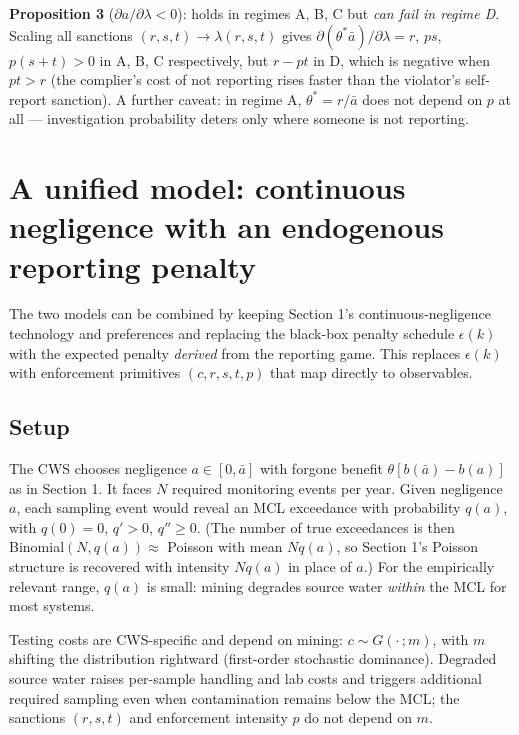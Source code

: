 \documentclass{article}
\begin{document}
\textbf{Proposition 3} ($\partial a/\partial\lambda < 0$): holds in regimes A, B, C but \emph{can fail in regime D}. Scaling all sanctions $(r,s,t) \to \lambda(r,s,t)$ gives $\partial(\theta^*\bar{a})/\partial\lambda = r$, $ps$, $p(s+t) > 0$ in A, B, C respectively, but $r - pt$ in D, which is negative when $pt > r$ (the complier's cost of not reporting rises faster than the violator's self-report sanction). A further caveat: in regime A, $\theta^* = r/\bar{a}$ does not depend on $p$ at all --- investigation probability deters only where someone is not reporting.

\section{A unified model: continuous negligence with an endogenous reporting penalty}

The two models can be combined by keeping Section 1's continuous-negligence technology and preferences and replacing the black-box penalty schedule $\epsilon(k)$ with the expected penalty \emph{derived} from the reporting game. This replaces $\epsilon(k)$ with enforcement primitives $(c, r, s, t, p)$ that map directly to observables.

\subsection{Setup}

The CWS chooses negligence $a \in [0,\bar{a}]$ with forgone benefit $\theta[b(\bar{a}) - b(a)]$ as in Section 1. It faces $N$ required monitoring events per year. Given negligence $a$, each sampling event would reveal an MCL exceedance with probability $q(a)$, with $q(0)=0$, $q'>0$, $q'' \ge 0$. (The number of true exceedances is then Binomial$(N, q(a)) \approx$ Poisson with mean $Nq(a)$, so Section 1's Poisson structure is recovered with intensity $Nq(a)$ in place of $a$.) For the empirically relevant range, $q(a)$ is small: mining degrades source water \emph{within} the MCL for most systems.

Testing costs are CWS-specific and depend on mining: $c \sim G(\cdot\,;m)$, with $m$ shifting the distribution rightward (first-order stochastic dominance). Degraded source water raises per-sample handling and lab costs and triggers additional required sampling even when contamination remains below the MCL; the sanctions $(r,s,t)$ and enforcement intensity $p$ do not depend on $m$.
\end{document}
